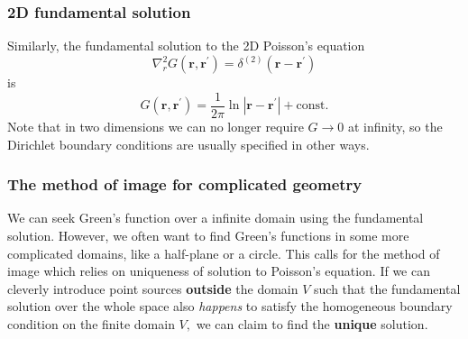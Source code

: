 \documentclass{article}
\begin{document}
\subsubsection{2D fundamental solution}
Similarly, the fundamental solution to the 2D Poisson's equation 
\[
    \nabla_r ^{2} G(\mathbf{r}, \mathbf{r^\prime } ) = \delta^{(2)} (\mathbf{r} - \mathbf{r^\prime } )
\]
is
\[
    \boxed{ 
        G(\mathbf{r} , \mathbf{r^\prime } ) = \frac{1}{2\pi } \ln{\left\vert \mathbf{r} - \mathbf{r^\prime }  \right\vert } + \mathrm{const}. 
    }
\]
Note that in two dimensions we can no longer require $G \to 0$ at infinity, so the Dirichlet boundary conditions are usually specified in other ways. 
\subsubsection{The method of image for complicated geometry}
We can seek Green's function over a infinite domain using the fundamental solution. However, we often want to find Green's functions in some more complicated domains, like a half-plane or a circle. This calls for the method of image which relies on uniqueness of solution to Poisson's equation. If we can cleverly introduce point sources \textbf{outside} the domain $V$ such that the fundamental solution over the whole space also \textit{happens} to satisfy the homogeneous boundary condition on the finite domain $V,$ we can claim to find the \textbf{unique} solution. 
\end{document}
